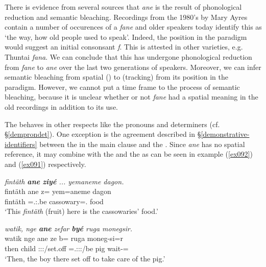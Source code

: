 There is evidence from several sources that \emph{ane} is the result of phonological reduction and semantic bleaching. Recordings from the 1980's by Mary Ayres contain a number of occurences of a  \emph{fane} and older speakers today identify this as `the way, how old people used to speak'. Indeed, the position in the paradigm would suggest an initial consonsant \emph{f}. This is attested in other  varieties, e.g.  Thuntai \emph{fana}. We can conclude that this  has undergone phonological reduction from \emph{fane} to \emph{ane} over the last two generations of speakers. Moreover, we can infer semantic bleaching from spatial () to  (tracking) from its position in the paradigm. However, we cannot put a time frame to the process of semantic bleaching, because it is unclear whether or not \emph{fane} had a spatial meaning in the old recordings in addition to its  use.%

The   behaves in other respects like the  pronouns and determiners (cf. \S{}\ref{demprondet}). One exception is the agreement described in \S{}\ref{demonstrative-identifiers} between the  in the main clause and the  . Since \emph{ane} has no spatial reference, it may combine with the  and the    as can be seen in example (\ref{ex092}) and (\ref{ex091}) respectively.

\begin{exe}
	\ex \emph{fintäth \textbf{ane} \textbf{ziyé} ... yemaneme dagon.}\\
	\gll fintäth ane z= yem=aneme dagon\\
	fintäth \Dem{} \Prox=\Tsg.\Masc:\Nonpast.be cassowary=\Poss{}.\Nsg{} food\\
	\trans `This \emph{fintäth} (fruit) here is the cassowaries' food.'\\ 
	\label{ex092}
\end{exe}
\begin{exe}
	\ex \emph{watik, nge \textbf{ane} zefar \textbf{byé} ruga monegsir.}\\
	\gll watik nge ane ze b= ruga moneg-si=r\\
	then child \Dem{} \Stsg:\Sbj:\Rpst:\Pfv/set.off \Med{}=\Tsg.\Masc:\Sbj:\Nonpast:\Ipfv/be pig wait-\Nmlz{}=\Purp{}\\
	\trans `Then, the boy there set off to take care of the pig.' 
	\label{ex091}
\end{exe}

